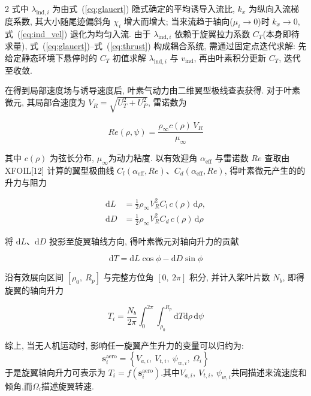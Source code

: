 \documentclass{aas}
\begin{document}
\begin{multicols}{2}
式中 $\lambda_{\mathrm{ind},i}$ 为由式~(\ref{eq:glauert}) 隐式确定的平均诱导入流比,
$k_x$ 为纵向入流梯度系数, 其大小随尾迹偏斜角 $\chi_i$ 增大而增大;
当来流趋于轴向($\mu_i\to0$)时 $k_x\to0$, 式~(\ref{eq:ind_vel}) 退化为均匀入流.
由于 $\lambda_{\mathrm{ind},i}$ 依赖于旋翼拉力系数 $C_T$(本身即待求量),
式~(\ref{eq:glauert})--式~(\ref{eq:thrust}) 构成耦合系统, 需通过固定点迭代求解:
先给定静态环境下悬停时的 $C_T$ 初值求解 $\lambda_{\mathrm{ind},i}$ 与 $v_{\mathrm{ind}}$,
再由叶素积分更新 $C_T$, 迭代至收敛.

\label{subsec:lift}

在得到局部速度场与诱导速度后, 叶素气动力由二维翼型极线查表获得. 对于叶素微元, 其局部合速度为 $V_R=\sqrt{U_T^2+U_P^2}$,
雷诺数为

\begin{equation}
Re(\rho,\psi)=\frac{\rho_\infty c(\rho)\,V_R}{\mu_\infty}
\label{eq:Re}
\end{equation}

其中 $c(\rho)$ 为弦长分布, $\mu_\infty$为动力粘度.
以有效迎角 $\alpha_{\mathrm{eff}}$ 与雷诺数 $Re$ 查取由 XFOIL[12] 计算的翼型极曲线
$C_l(\alpha_{\mathrm{eff}},Re)$、$C_d(\alpha_{\mathrm{eff}},Re)$, 得叶素微元产生的的升力与阻力

\begin{equation}
\begin{aligned}
\mathrm{d}L&=\frac{1}{2}\rho_\infty V_R^2 C_l\,c(\rho)\,\mathrm{d}\rho,\\
\mathrm{d}D&=\frac{1}{2}\rho_\infty V_R^2 C_d\,c(\rho)\,\mathrm{d}\rho
\end{aligned}
\label{eq:dLdD}
\end{equation}

将 $\mathrm{d}L$、$\mathrm{d}D$ 投影至旋翼轴线方向, 得叶素微元对轴向升力的贡献

\begin{equation}
\mathrm{d}T=\mathrm{d}L\cos\phi-\mathrm{d}D\sin\phi
\label{eq:dT}
\end{equation}

沿有效展向区间 $[\rho_0,\ R_p]$ 与完整方位角 $[0,\ 2\pi]$ 积分, 并计入桨叶片数
$N_b$, 即得旋翼的轴向升力

\begin{equation}
T_i=\frac{N_b}{2\pi}\int_{0}^{2\pi}\!\!\int_{\rho_0}^{R_p}
\mathrm{d}T\mathrm{d}\rho\,\mathrm{d}\psi
\label{eq:thrust}
\end{equation}

综上, 当无人机运动时, 影响任一旋翼产生升力的变量可以归约为:
\begin{equation}
\bm{s}_i^{\mathrm{aero}}=\left\{V_{a,i},\ V_{t,i},\ \psi_{w,i}, \ \Omega_i\right\}
\label{eq:state_aero}
\end{equation}
于是旋翼轴向升力可表示为 $T_i=f\!\left(\bm{s}_i^{\mathrm{aero}}\right)$.其中$V_{a,i},\ V_{t,i},\ \psi_{w,i}$共同描述来流速度和倾角,而$\Omega_i$描述旋翼转速.


\end{multicols}
\end{document}
